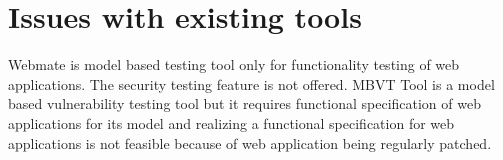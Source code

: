 \section{Issues with existing tools}

Webmate is model based testing tool only for functionality testing of web applications. The security testing feature is not offered. MBVT Tool is a model based vulnerability testing tool but it requires functional specification of web applications for its model and realizing a functional specification for web applications is not feasible because of web application being regularly patched.